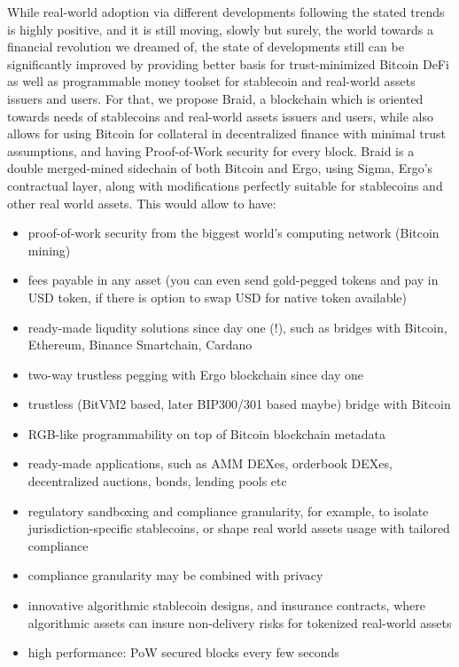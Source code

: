 \documentclass{llncs}   %
\newcommand{\bc}{Braid}
\begin{document}
While real-world adoption via different developments following the stated trends is highly positive, and it is still moving, slowly but surely, the world towards a financial revolution we dreamed of, the state of developments still can be significantly improved by providing better basis for trust-minimized  Bitcoin DeFi as well as programmable money toolset for stablecoin and real-world assets issuers and users. For that, we propose \bc{}, a blockchain which is oriented towards needs of stablecoins and real-world assets  issuers and users, while also allows for using Bitcoin for collateral in decentralized finance with minimal trust assumptions, and having Proof-of-Work security for every block. \bc{} is a double merged-mined sidechain of both Bitcoin and Ergo, using Sigma, Ergo's contractual layer, along with modifications perfectly suitable for stablecoins and other real world assets. This would allow to have:

\begin{itemize}
  \item proof-of-work security from the biggest world's computing network (Bitcoin mining)
  \item fees payable in any asset (you can even send gold-pegged tokens and pay in USD token, if there is option to swap USD for native token available)
  \item ready-made liqudity solutions since day one (!), such as bridges with Bitcoin, Ethereum, Binance Smartchain, Cardano
  \item two-way trustless pegging with Ergo blockchain since day one
  \item trustless (BitVM2 based, later BIP300/301 based maybe) bridge with Bitcoin
  \item RGB-like programmability on top of Bitcoin blockchain metadata
  \item ready-made applications, such as AMM DEXes, orderbook DEXes, decentralized auctions, bonds, lending pools etc
  \item regulatory sandboxing and compliance granularity, for example, to isolate jurisdiction-specific stablecoins, or shape real world assets usage with tailored compliance
  \item compliance granularity may be combined with privacy
  \item innovative algorithmic stablecoin designs, and insurance contracts, where algorithmic assets can insure non-delivery risks for tokenized real-world assets
  \item high performance: PoW secured blocks every few seconds
\end{itemize}
\end{document}
